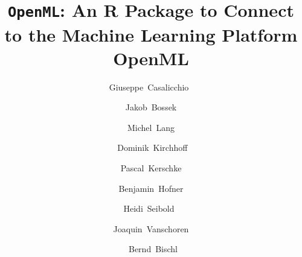 \newenvironment{knitrout}{}{} %

\usepackage{alltt}       %
%
\smartqed  %
%
\usepackage{graphicx}
\usepackage{amsmath,amssymb,array}
\usepackage{booktabs}
\usepackage{todonotes}
\usepackage[sectionbib,round]{natbib}
\usepackage[hyphens]{url}
\usepackage{hyperref}


%
%
%
\newcommand{\new}[1]{{#1}}
\newcommand{\code}[1]{\texttt{#1}}

\newcommand{\mycomment}[2][]{%
    \refstepcounter{mycomment}%
    {%
    \todo[color={red!100!green!33},size=\small]{%
        \textbf{Comment [\uppercase{#1}\themycomment]:}~#2}%
    }}
\newcommand{\todoBH}[1]{\mycomment[BH]{#1}}
%
%



\title{\new{\code{OpenML}: An R Package to Connect to the Machine Learning Platform OpenML}}



\author{Giuseppe~Casalicchio~\and~Jakob~Bossek~\and~Michel~Lang~\and~
Dominik~Kirchhoff~\and~Pascal~Kerschke~\and~Benjamin~Hofner~\and  
Heidi~Seibold~\and~Joaquin~Vanschoren~\and~Bernd~Bischl}

